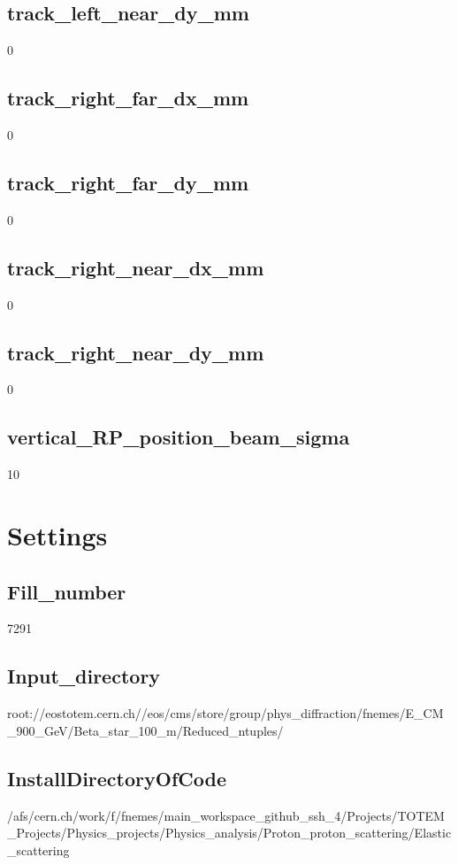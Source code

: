 \documentclass{article}
\begin{document}
\begin{landscape}
\subsection{track\_left\_near\_dy\_mm}
0 \newline
\subsection{track\_right\_far\_dx\_mm}
0 \newline
\subsection{track\_right\_far\_dy\_mm}
0 \newline
\subsection{track\_right\_near\_dx\_mm}
0 \newline
\subsection{track\_right\_near\_dy\_mm}
0 \newline
\subsection{vertical\_RP\_position\_beam\_sigma}
10 \newline
\section{Settings}
\subsection{Fill\_number}
7291 \newline
\subsection{Input\_directory}
root://eostotem.cern.ch//eos/cms/store/group/phys\_diffraction/fnemes/E\_CM\_900\_GeV/Beta\_star\_100\_m/Reduced\_ntuples/ \newline
\subsection{InstallDirectoryOfCode}
/afs/cern.ch/work/f/fnemes/main\_workspace\_github\_ssh\_4/Projects/TOTEM\_Projects/Physics\_projects/Physics\_analysis/Proton\_proton\_scattering/Elastic\_scattering \newline

\end{landscape}
\end{document}

